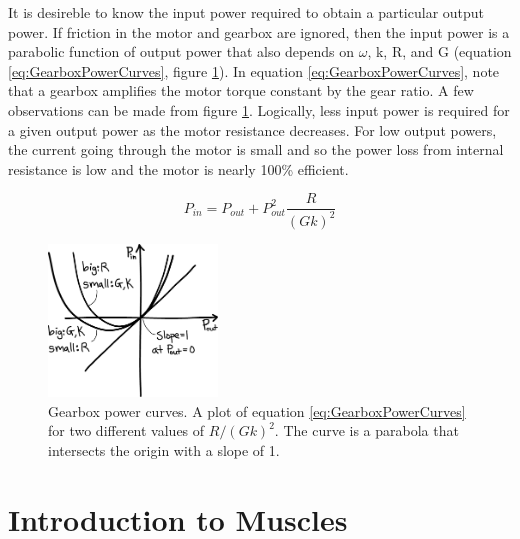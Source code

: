 It is desireble to know the input power required to obtain a particular output power. If friction in the motor and gearbox are ignored, then the input power is a parabolic function of output power that also depends on $\omega$, k, R, and G (equation \ref{eq:GearboxPowerCurves}, figure \ref{fig:GearboxPowerCurves}). In equation \ref{eq:GearboxPowerCurves}, note that a gearbox amplifies the motor torque constant by the gear ratio. A few observations can be made from figure \ref{fig:GearboxPowerCurves}. Logically, less input power is required for a given output power as the motor resistance decreases. For low output powers, the current going through the motor is small and so the power loss from internal resistance is low and the motor is nearly 100\% efficient. 

\begin{equation}
P_{in}=P_{out}+P_{out}^{2}\frac{R}{(Gk)^{2}}
\label{eq:GearboxPowerCurves}
\end{equation}


\begin{figure}[htb]		%
\begin{centering}
\includegraphics[width=0.4\textwidth]{Figures/GearboxPowerCurves}\par
\end{centering}
\caption[Plot: Gearbox Power Curves]{Gearbox power curves. A plot of equation \ref{eq:GearboxPowerCurves} for two different values of $R/(Gk)^2$. The curve is a parabola that intersects the origin with a slope of 1.}
\label{fig:GearboxPowerCurves}
\end{figure}
%


\section{Introduction to Muscles} %
\label{sec:IntroductionToMuscles}


